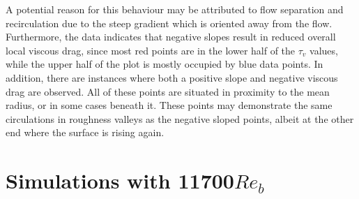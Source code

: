 A potential reason for this behaviour may be attributed to flow separation and recirculation due to the steep gradient which is oriented away from the flow.
Furthermore, the data indicates that negative slopes result in reduced overall local viscous drag, since most red points are in the lower half of the $\tau_v$ values, while the upper half of the plot is mostly occupied by blue data points.
In addition, there are instances where both a positive slope and negative viscous drag are observed. 
All of these points are situated in proximity to the mean radius, or in some cases beneath it.
These points may demonstrate the same circulations in roughness valleys as the negative sloped points, albeit at the other end where the surface is rising again.

\section{Simulations with 11700$Re_b$}\label{sec: results 11700 Reb}

